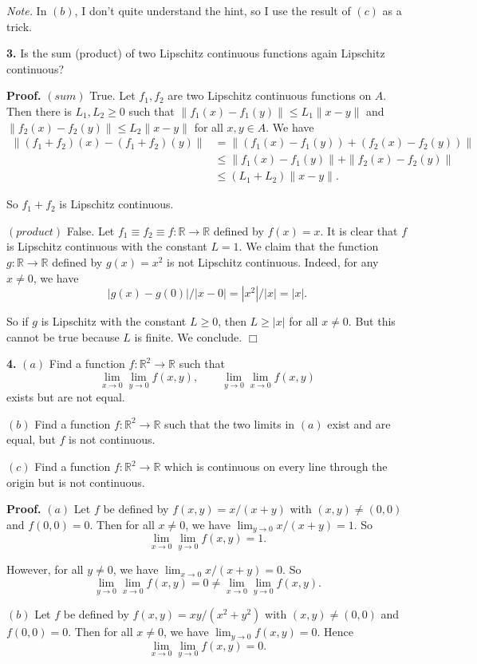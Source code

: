 \documentclass{article}
\begin{document}
\emph{Note.} In $(b)$, I don't quite understand the hint, so I use the
result of $(c)$ as a trick.

    \textbf{3.} Is the sum (product) of two Lipschitz continuous functions
again Lipschitz continuous?

\textbf{Proof.} $(sum)$ True. Let $f_1, f_2$ are two Lipschitz
continuous functions on $A$. Then there is $L_1,L_2 \ge 0$ such that
$\|f_1(x)-f_1(y)\|\le L_1\|x-y\|$ and $\|f_2(x)-f_2(y)\|\le L_2\|x-y\|$
for all $x,y\in A$. We have \[\begin{aligned}
\|(f_1+f_2)(x) - (f_1+f_2)(y)\| &= \|(f_1(x)-f_1(y)) + (f_2(x)-f_2(y))\| \\
&\le \|f_1(x)-f_1(y)\| + \|f_2(x)-f_2(y)\|\\
&\le (L_1+L_2)\|x-y\|.
\end{aligned}\]

So $f_1 + f_2$ is Lipschitz continuous.

$(product)$ False. Let
$f_1 \equiv f_2 \equiv f :\mathbb{R}\to \mathbb{R}$ defined by $f(x)=x$.
It is clear that $f$ is Lipschitz continuous with the constant $L = 1$.
We claim that the function $g:\mathbb{R}\to \mathbb{R}$ defined by
$g(x) = x^2$ is not Lipschitz continuous. Indeed, for any $x\ne 0$, we
have \[|g(x)-g(0)|/|x-0| = |x^2|/|x| = |x|.\]

So if $g$ is Lipschitz with the constant $L\ge 0$, then $L \ge |x|$ for
all $x\ne 0$. But this cannot be true because $L$ is finite. We
conclude. $\Box$

    \textbf{4.} $(a)$ Find a function $f:\mathbb{R}^2\to \mathbb{R}$ such
that \[
\lim_{x\to 0}\lim_{y\to 0} f(x,y),\qquad \lim_{y\to 0}\lim_{x\to 0} f(x,y)
\] exists but are not equal.

$(b)$ Find a function $f:\mathbb{R}^2 \to \mathbb{R}$ such that the two
limits in $(a)$ exist and are equal, but $f$ is not continuous.

$(c)$ Find a function $f:\mathbb{R}^2 \to \mathbb{R}$ which is
continuous on every line through the origin but is not continuous.

\textbf{Proof.} $(a)$ Let $f$ be defined by $f(x,y) = x/(x+y)$ with
$(x,y)\ne (0,0)$ and $f(0,0) = 0$. Then for all $x\ne 0$, we have
$\lim_{y\to 0} x/(x+y) = 1$. So
\[ \lim_{x\to 0}\lim_{y\to 0} f(x,y) = 1.\]

However, for all $y\ne 0$, we have $\lim_{x\to 0} x/(x+y) = 0$. So
\[ \lim_{y\to 0}\lim_{x\to 0} f(x,y) = 0 \ne  \lim_{x\to 0}\lim_{y\to 0} f(x,y).\]

$(b)$ Let $f$ be defined by $f(x,y) = xy/(x^2+y^2)$ with
$(x,y)\ne (0,0)$ and $f(0,0) = 0$. Then for all $x\ne 0$, we have
$\lim_{y\to 0} f(x,y) = 0$. Hence
\[ \lim_{x\to 0}\lim_{y\to 0} f(x,y) = 0.\]
\end{document}
